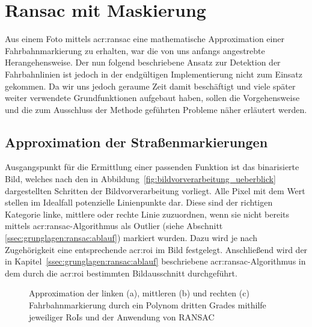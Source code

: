 \section{Ransac mit Maskierung \dcfirstauthorshort} 
\label{sec:maskenbau}
\label{sec:polynombasierte_fahrspurerkennung:ransac}

Aus einem Foto mittels \gls{acr:ransac} eine mathematische Approximation einer Fahrbahnmarkierung zu erhalten, war die von uns anfangs angestrebte Herangehensweise. Der nun folgend beschriebene Ansatz zur Detektion der Fahrbahnlinien ist jedoch in der endgültigen Implementierung nicht zum Einsatz gekommen. Da wir uns jedoch geraume Zeit damit beschäftigt und viele später weiter verwendete Grundfunktionen aufgebaut haben, sollen die Vorgehensweise und die zum Ausschluss der Methode geführten Probleme näher erläutert werden. 

\subsection{Approximation der Straßenmarkierungen}

Ausgangspunkt für die Ermittlung einer passenden Funktion ist das binarisierte Bild, welches nach den in Abbildung~\ref{fig:bildvorverarbeitung_ueberblick} dargestellten Schritten der Bildvorverarbeitung vorliegt. Alle Pixel mit dem Wert \grqq{} stellen im Idealfall potenzielle Linienpunkte dar. Diese sind der richtigen Kategorie \glqq linke\grqq , \glqq mittlere\grqq{} oder \glqq rechte\grqq{} Linie zuzuordnen, wenn sie nicht bereits mittels \gls{acr:ransac}-Algorithmus als Outlier (siehe Abschnitt \ref{ssec:grunglagen:ransac:ablauf}) markiert wurden. Dazu wird je nach Zugehörigkeit eine entsprechende \gls{acr:roi} im Bild festgelegt. Anschließend wird der in Kapitel~\ref{ssec:grunglagen:ransac:ablauf} beschriebene \gls{acr:ransac}-Algorithmus in dem durch die \gls{acr:roi} bestimmten Bildausschnitt durchgeführt.

\begin{figure}[htbp]
	\centering
	\hfill
	\hfill
	\caption{Approximation der linken (a), mittleren (b) und rechten (c) Fahrbahnmarkierung durch ein Polynom dritten Grades mithilfe jeweiliger RoIs und der Anwendung von RANSAC}
	\label{fig:fahrspurerkennung_ransac_masken}
\end{figure} 

